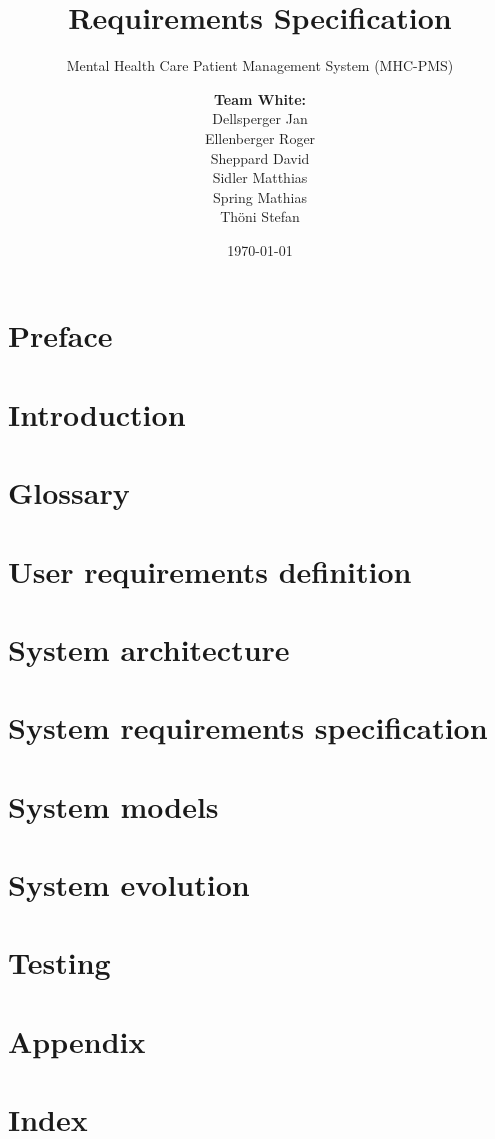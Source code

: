 \documentclass[a4paper]{scrreprt}
\title{Requirements Specification}
\subtitle{Mental Health Care Patient Management System (MHC-PMS)}
\author{
\begin{tabular}{l}
\normalfont\bfseries{Team White:}\\
Dellsperger Jan\\
Ellenberger Roger\\
Sheppard David\\
Sidler Matthias\\
Spring Mathias\\
Thöni Stefan
\end{tabular}
}
\date{\today}
\begin{document}
\begin{titlepage}
	\maketitle
\end{titlepage}


\tableofcontents


\chapter{Preface}

\chapter{Introduction}

\chapter{Glossary}

\chapter{User requirements definition}

\chapter{System architecture}

\chapter{System requirements specification}

\chapter{System models}

\chapter{System evolution}

\chapter{Testing}

\chapter{Appendix}

\chapter{Index}
\end{document}
